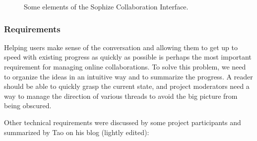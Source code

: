 \documentclass[]{ceurart}
\begin{document}
\begin{figure}[ht]
\begin{center}
\caption{Some elements of the Sophize Collaboration Interface.}
\label{collab}
\end{center}
\end{figure}

\subsubsection*{Requirements}

Helping users make sense of the conversation and allowing them to get up to speed with existing progress as quickly as possible is perhaps the most important requirement for managing online collaborations. To solve this problem, we need to organize the ideas in an intuitive way and to summarize the progress. A reader should be able to quickly grasp the current state, and project moderators need a way to manage the direction of various threads to avoid the big picture from being obscured.

Other technical requirements were discussed by some project participants and summarized by Tao on his blog \cite{whats_new_2009} (lightly edited):
\end{document}
